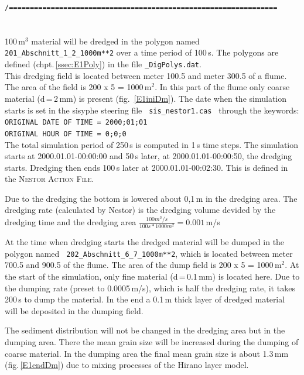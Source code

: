 \hspace*{3mm} \texttt{\small{/================================================================}}\\
\\
\\
100\,m$^3$ material will be dredged in the polygon named \texttt{201\_Abschnitt\_1\_2\_1000m**2} over a time period of 100\,s.
The polygons are defined (chpt.\,\ref{ssec:E1Poly}) in the file \texttt{\_DigPolys.dat}.\\
This dredging field is located between meter 100.5 and meter 300.5 of a flume. The area of the field is 200 x 5
= 1000\,m$^2$. In this part of the flume only coarse material (d\,=\,2\,mm) is present (fig.~\ref{E1iniDm}).
The date when the simulation starts
is set in the sisyphe steering file \texttt{~sis\_nestor1.cas~} through the keywords:\\
\texttt{ORIGINAL DATE OF TIME = 2000;01;01}\\
\texttt{ORIGINAL HOUR OF TIME = 0;0;0}\\
The total simulation period of 250\,s is computed in 1\,s time steps.
The simulation starts at 2000.01.01-00:00:00 and 50\,s later, at 2000.01.01-00:00:50, the dredging starts.
Dredging then ends 100\,s later at 2000.01.01-00:02:30.
This is defined in the \textsc{Nestor Action File}.

Due to the dredging the bottom is lowered about 0,1\,m in the dredging area.
The dredging rate (calculated by Nestor) is the dredging volume devided by the dredging time and the dredging area
$\frac{100 m^3/s}{100 s*1000 m^2}=0.001$\,m/s

At the time when dredging starts the dredged material will
be dumped in the polygon named \texttt{~202\_Abschnitt\_6\_7\_1000m**2}, which is located between meter 700.5 and 900.5 of the flume.
The area of the dump field is 200 x 5 = 1000\,m$^2$.
At the start of the simulation, only fine material (d\,=\,0.1\,mm) is located here.
Due to the dumping rate (preset to 0.0005\,m/s), which is half the dredging rate, it takes 200\,s to dump the material.
In the end a 0.1\,m thick layer of dredged material will be deposited in the dumping field.

The sediment distribution will not be changed in the dredging area but in the dumping area.
There the mean grain size will be increased during the dumping of coarse material.
In the dumping area the final mean grain size is about 1.3\,mm (fig.\,\ref{E1endDm}) due to mixing processes of the Hirano layer model.




